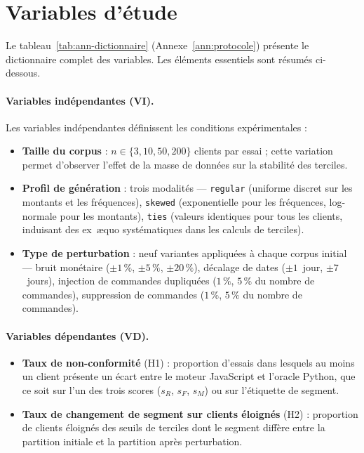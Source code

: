 \section{Variables d'étude}
\label{sec:methodes-variables}

Le tableau~\ref{tab:ann-dictionnaire} (Annexe~\ref{ann:protocole}) présente le dictionnaire
complet des variables. Les éléments essentiels sont résumés ci-dessous.

\paragraph{Variables indépendantes (VI).}
Les variables indépendantes définissent les conditions expérimentales :

\begin{itemize}
  \item \textbf{Taille du corpus} : $n \in \{3, 10, 50, 200\}$ clients par essai ; cette
    variation permet d'observer l'effet de la masse de données sur la stabilité des terciles.
  \item \textbf{Profil de génération} : trois modalités — \texttt{regular} (uniforme discret
    sur les montants et les fréquences), \texttt{skewed} (exponentielle pour les fréquences,
    log-normale pour les montants), \texttt{ties} (valeurs identiques pour tous les clients,
    induisant des ex~æquo systématiques dans les calculs de terciles).
  \item \textbf{Type de perturbation} : neuf variantes appliquées à chaque corpus initial —
    bruit monétaire ($\pm1\,\%$, $\pm5\,\%$, $\pm20\,\%$), décalage de dates ($\pm1$~jour,
    $\pm7$~jours), injection de commandes dupliquées ($1\,\%$, $5\,\%$ du nombre de
    commandes), suppression de commandes ($1\,\%$, $5\,\%$ du nombre de commandes).
\end{itemize}

\paragraph{Variables dépendantes (VD).}
\begin{itemize}
  \item \textbf{Taux de non-conformité} (H1) : proportion d'essais dans lesquels au moins
    un client présente un écart entre le moteur JavaScript et l'oracle Python, que ce soit
    sur l'un des trois scores ($s_R$, $s_F$, $s_M$) ou sur l'étiquette de segment.
  \item \textbf{Taux de changement de segment sur clients éloignés} (H2) : proportion de
    clients éloignés des seuils de terciles dont le segment diffère entre la partition initiale
    et la partition après perturbation.
\end{itemize}

